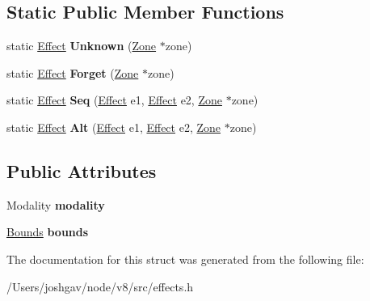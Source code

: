 \subsection*{Static Public Member Functions}
\begin{DoxyCompactItemize}
\item 
static \hyperlink{structv8_1_1internal_1_1_effect}{Effect} {\bfseries Unknown} (\hyperlink{classv8_1_1internal_1_1_zone}{Zone} $\ast$zone)\hypertarget{structv8_1_1internal_1_1_effect_a11668ede7c29f4ad9d20bee2825c914f}{}\label{structv8_1_1internal_1_1_effect_a11668ede7c29f4ad9d20bee2825c914f}

\item 
static \hyperlink{structv8_1_1internal_1_1_effect}{Effect} {\bfseries Forget} (\hyperlink{classv8_1_1internal_1_1_zone}{Zone} $\ast$zone)\hypertarget{structv8_1_1internal_1_1_effect_ada297ee6768879616eef3714bc6d4259}{}\label{structv8_1_1internal_1_1_effect_ada297ee6768879616eef3714bc6d4259}

\item 
static \hyperlink{structv8_1_1internal_1_1_effect}{Effect} {\bfseries Seq} (\hyperlink{structv8_1_1internal_1_1_effect}{Effect} e1, \hyperlink{structv8_1_1internal_1_1_effect}{Effect} e2, \hyperlink{classv8_1_1internal_1_1_zone}{Zone} $\ast$zone)\hypertarget{structv8_1_1internal_1_1_effect_af468c95d1e4a6e1b51322e0fcf281cd4}{}\label{structv8_1_1internal_1_1_effect_af468c95d1e4a6e1b51322e0fcf281cd4}

\item 
static \hyperlink{structv8_1_1internal_1_1_effect}{Effect} {\bfseries Alt} (\hyperlink{structv8_1_1internal_1_1_effect}{Effect} e1, \hyperlink{structv8_1_1internal_1_1_effect}{Effect} e2, \hyperlink{classv8_1_1internal_1_1_zone}{Zone} $\ast$zone)\hypertarget{structv8_1_1internal_1_1_effect_a92fbb9d3d35cd46d45e9541e0c1ba3cf}{}\label{structv8_1_1internal_1_1_effect_a92fbb9d3d35cd46d45e9541e0c1ba3cf}

\end{DoxyCompactItemize}
\subsection*{Public Attributes}
\begin{DoxyCompactItemize}
\item 
Modality {\bfseries modality}\hypertarget{structv8_1_1internal_1_1_effect_a28b51f74c7f1ed7dbe7219474d3406d5}{}\label{structv8_1_1internal_1_1_effect_a28b51f74c7f1ed7dbe7219474d3406d5}

\item 
\hyperlink{structv8_1_1internal_1_1_bounds}{Bounds} {\bfseries bounds}\hypertarget{structv8_1_1internal_1_1_effect_a3cc31d9ea8b9f00de94ca13068ecdf0a}{}\label{structv8_1_1internal_1_1_effect_a3cc31d9ea8b9f00de94ca13068ecdf0a}

\end{DoxyCompactItemize}


The documentation for this struct was generated from the following file\+:\begin{DoxyCompactItemize}
\item 
/\+Users/joshgav/node/v8/src/effects.\+h\end{DoxyCompactItemize}
